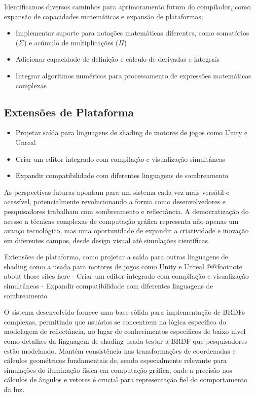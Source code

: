 Identificamos diversos caminhos para aprimoramento futuro do compilador, como expansão de capacidades matemáticas e expansão de plataformas;



\begin{itemize}
    \item Implementar suporte para notações matemáticas diferentes, como somatórios ($\Sigma$) e acúmulo de multiplicações ($\Pi$)
    \item Adicionar capacidade de definição e cálculo de derivadas e integrais
    \item Integrar algoritmos numéricos para processamento de expressões matemáticas complexas
\end{itemize}

\subsection{Extensões de Plataforma}

\begin{itemize}
    \item Projetar saída para linguagens de shading de motores de jogos como Unity e Unreal
    \item Criar um editor integrado com compilação e visualização simultâneas
    \item Expandir compatibilidade com diferentes linguagens de sombreamento
\end{itemize}

As perspectivas futuras apontam para um sistema cada vez mais versátil e acessível, potencialmente revolucionando a forma como desenvolvedores e pesquisadores trabalham com sombreamento e reflectância. A democratização do acesso a técnicas complexas de computação gráfica representa não apenas um avanço tecnológico, mas uma oportunidade de expandir a criatividade e inovação em diferentes campos, desde design visual até simulações científicas.


Extensões de plataforma, como projetar a saída para outras linguagens de shading como a usada para motores de jogos como Unity e Unreal @@footnote about those sites here
- Criar um editor integrado com compilação e visualização simultâneas
- Expandir compatibilidade com diferentes linguagens de sombreamento

O sistema desenvolvido fornece uma base sólida para implementação de BRDFs complexas, permitindo que usuários se concentrem na lógica específica do modelagem de reflectância, no lugar de conhecimentos especificos de baixo nivel como detalhes da linguagem de shading usada testar a BRDF que pesquisadores estão modelando. Mantém consistência nas transformações de coordenadas e cálculos geométricos fundamentais de, sendo especialmente relevante para simulações de iluminação física em computação gráfica, onde a precisão nos cálculos de ângulos e vetores é crucial para representação fiel do comportamento da luz.

